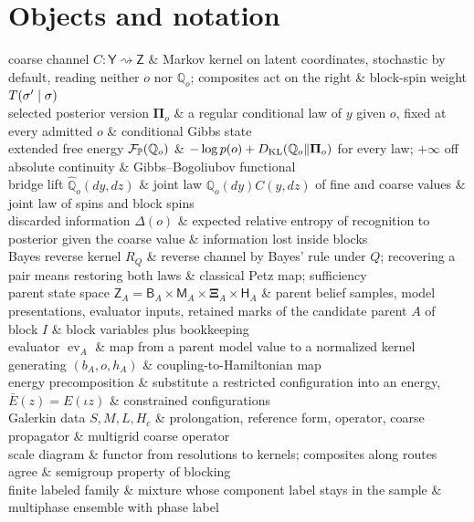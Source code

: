\section{Objects and notation}
\label{comp:ch09-objects}

\begin{decoder}
coarse channel $C:\mathsf Y\rightsquigarrow\mathsf Z$ & Markov kernel on latent coordinates, stochastic by default, reading neither $o$ nor $\mathbb Q_o$; composites act on the right & block-spin weight $T(\sigma'\mid\sigma)$\\
selected posterior version $\boldsymbol\Pi_o$ & a regular conditional law of $y$ given $o$, fixed at every admitted $o$ & conditional Gibbs state\\
extended free energy $\mathcal F_{\mathbb P}(\mathbb Q_o)$ & $-\log p(o)+D_{\mathrm{KL}}(\mathbb Q_o\Vert\boldsymbol\Pi_o)$ for every law; $+\infty$ off absolute continuity & Gibbs--Bogoliubov functional\\
bridge lift $\widehat{\mathbb Q}_o(dy,dz)$ & joint law $\mathbb Q_o(dy)C(y,dz)$ of fine and coarse values & joint law of spins and block spins\\
discarded information $\Delta(o)$ & expected relative entropy of recognition to posterior given the coarse value & information lost inside blocks\\
Bayes reverse kernel $R_Q$ & reverse channel by Bayes' rule under $Q$; recovering a pair means restoring both laws & classical Petz map; sufficiency\\
parent state space $\mathsf Z_A=\mathsf B_A\times\mathsf M_A\times\boldsymbol\Xi_A\times\mathsf H_A$ & parent belief samples, model presentations, evaluator inputs, retained marks of the candidate parent $A$ of block $I$ & block variables plus bookkeeping\\
evaluator $\operatorname{ev}_A$ & map from a parent model value to a normalized kernel generating $(b_A,o,h_A)$ & coupling-to-Hamiltonian map\\
energy precomposition & substitute a restricted configuration into an energy, $\bar E(z)=E(\iota z)$ & constrained configurations\\
Galerkin data $S,M,L,H_c$ & prolongation, reference form, operator, coarse propagator & multigrid coarse operator\\
scale diagram & functor from resolutions to kernels; composites along routes agree & semigroup property of blocking\\
finite labeled family & mixture whose component label stays in the sample & multiphase ensemble with phase label\\

\end{decoder}
